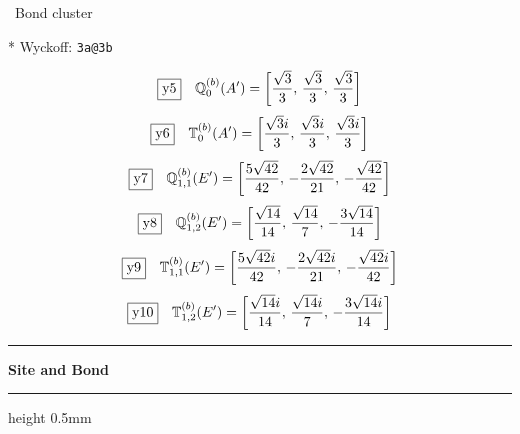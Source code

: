 \documentclass[fleqn,10pt,landscape]{jsarticle}
\begin{document}
\noindent\textbullet\, Bond cluster

\vspace{5mm}

\noindent ** Wyckoff: \texttt{3a@3b}

\begin{dmath*}
\fbox{y5}\quad \mathbb{Q}_{0}^{(b)}(A^{\prime})=\left[ \frac{\sqrt{3}}{3},\, \frac{\sqrt{3}}{3},\, \frac{\sqrt{3}}{3} \right]
\end{dmath*}
\begin{dmath*}
\fbox{y6}\quad \mathbb{T}_{0}^{(b)}(A^{\prime})=\left[ \frac{\sqrt{3} i}{3},\, \frac{\sqrt{3} i}{3},\, \frac{\sqrt{3} i}{3} \right]
\end{dmath*}
\begin{dmath*}
\fbox{y7}\quad \mathbb{Q}_{1,1}^{(b)}(E^{\prime})=\left[ \frac{5 \sqrt{42}}{42},\, - \frac{2 \sqrt{42}}{21},\, - \frac{\sqrt{42}}{42} \right]
\end{dmath*}
\begin{dmath*}
\fbox{y8}\quad \mathbb{Q}_{1,2}^{(b)}(E^{\prime})=\left[ \frac{\sqrt{14}}{14},\, \frac{\sqrt{14}}{7},\, - \frac{3 \sqrt{14}}{14} \right]
\end{dmath*}
\begin{dmath*}
\fbox{y9}\quad \mathbb{T}_{1,1}^{(b)}(E^{\prime})=\left[ \frac{5 \sqrt{42} i}{42},\, - \frac{2 \sqrt{42} i}{21},\, - \frac{\sqrt{42} i}{42} \right]
\end{dmath*}
\begin{dmath*}
\fbox{y10}\quad \mathbb{T}_{1,2}^{(b)}(E^{\prime})=\left[ \frac{\sqrt{14} i}{14},\, \frac{\sqrt{14} i}{7},\, - \frac{3 \sqrt{14} i}{14} \right]
\end{dmath*}
\vspace{5mm}
\noindent \rule[0.5mm]{5mm}{0.5mm}\hspace{3mm}\textbf{Site and Bond}\hspace{3mm}\leaders\hrule height 0.5mm\hfill\kern0pt
\vspace{3mm}
\end{document}
